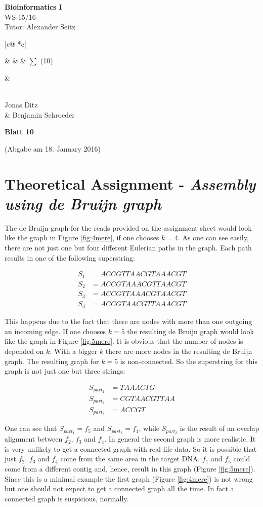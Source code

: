\documentclass[%
   10pt,              %
   ngerman,           %
   a4paper,           %
   DIV11,             %
]{scrartcl}%
\makeatletter
\def\header#1#2#3#4#5#6#7{\pagestyle{empty}
\noindent
\begin{minipage}[t]{0.6\textwidth}
\begin{flushleft}
\textbf{#4}\\%
#6\\%
Tutor: #2  %
\end{flushleft}
\end{minipage}
\begin{minipage}[t]{0.4\textwidth}
\begin{flushright}
\points{#7}%
\vspace*{0.2cm}
#5%
\end{flushright}
\end{minipage}

\begin{center}
{\Large\textbf{ Blatt #1}} %

{(Abgabe am #3)} %
\end{center}
}
\newenvironment{vartab}[1]
{
    \begin{tabular}{ |c@{} *{#1}{c|} } %
}{
    \end{tabular}
}
\newcommand{\myformat}[1]{& #1}
\newcommand{\numbers}[1]{
  \newcounter{ctra}
\setcounter{ctra}{1}
\whiledo {\value{ctra} < #1}%
{%
  \myformat{\thectra}
  \stepcounter{ctra}%
}
\myformat{\thectra}
}
\newcommand{\emptyLine}[1]{
  \newcounter{ctra1}
\setcounter{ctra}{1}
\whiledo {\value{ctra1} < #1}%
{%
  \myformat{\hspace*{0.5cm}}
  \stepcounter{ctra1}%
}
}
\newcommand{\points}[1]{
\newcounter{colmns}
\setcounter{colmns}{#1}
\stepcounter{colmns}
  \begin{vartab}{\thecolmns}
    \numbers{#1} & $\sum$ (10)\\\hline
    \emptyLine{\thecolmns}\\
  \end{vartab}
}
\makeatother
\begin{document}
\header{10}{Alexander Seitz}{18. January 2016}{Bioinformatics I}{\\Jonas Ditz \\\& Benjamin Schroeder}{WS 15/16}{2}

\section*{Theoretical Assignment - \textit{Assembly using de Bruijn graph}}

The de Bruijn graph for the reads provided on the assignment sheet would look like the graph in
Figure \ref{fig:4mere}, if one chooses $k = 4$. As one can see easily, there are not just one but 
four different Eulerian paths in the graph. Each path results in one of the following superstring:

\begin{align}
 S_1 &= ACCGTTAACGTAAACGT \nonumber \\
 S_2 &= ACCGTAAACGTTAACGT \nonumber \\
 S_3 &= ACCGTTAAACGTAACGT \nonumber \\
 S_4 &= ACCGTAACGTTAAACGT \nonumber
\end{align}

This happens due to the fact that there are nodes with more than one outgoing an incoming edge. If
one chooses $k = 5$ the resulting de Bruijn graph would look like the graph in Figure \ref{fig:5mere}.
It is obvious that the number of nodes is depended on $k$. With a bigger $k$ there are more nodes in 
the resulting de Bruijn graph. The resulting graph for $k = 5$ is non-connected. So the superstring 
for this graph is not just one but three strings: 

\begin{align}
 S_{part_1} &= TAAACTG \nonumber \\
 S_{part_2} &= CGTAACGTTAA \nonumber \\
 S_{part_3} &= ACCGT \nonumber
\end{align}

One can see that $S_{part_1} = f_5$ and $S_{part_3} = f_1$, while $S_{part_2}$ is the result of an 
overlap alignment between $f_2$, $f_3$ and $f_4$. In general the second graph is more realistic. 
It is very unlikely to get a connected graph with real-life data. So it is possible that just $f_2$, 
$f_3$ and $f_4$ come from the same area in the target DNA. $f_1$ and $f_5$ could come from a different 
contig and, hence, result in this graph (Figure \ref{fig:5mere}). Since this is a minimal example 
the first graph (Figure \ref{fig:4mere}) is not wrong but one should not expect to get a connected 
graph all the time. In fact a connected graph is suspicious, normally.
\end{document}
